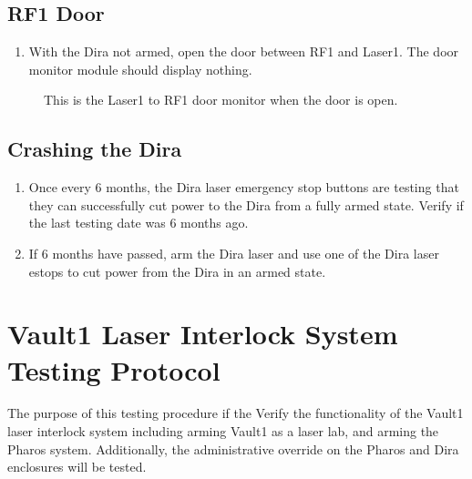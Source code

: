 \documentclass[letterpaper,10pt,english]{sphinxmanual}
\begin{document}
\subsection{RF\sphinxhyphen{}1 Door}
\label{\detokenize{testing_documentation/Laser-1:rf-1-door}}\begin{enumerate}
%
\item {} 
\sphinxAtStartPar
With the Dira not armed, open the door between RF\sphinxhyphen{}1 and Laser\sphinxhyphen{}1.
The door monitor module should display nothing.

\end{enumerate}

\begin{figure}[htbp]
\centering
\capstart

\noindent{}
\caption{ This is the Laser\sphinxhyphen{}1 to RF\sphinxhyphen{}1 door monitor when the door is open.}\label{\detokenize{testing_documentation/Laser-1:id11}}\end{figure}


\subsection{Crashing the Dira}
\label{\detokenize{testing_documentation/Laser-1:crashing-the-dira}}\begin{enumerate}
%
\item {} 
\sphinxAtStartPar
Once every 6 months, the Dira laser emergency stop buttons are testing that they can successfully cut power to the Dira from a fully armed state.
Verify if the last testing date was 6 months ago.

\item {} 
\sphinxAtStartPar
If 6 months have passed, arm the Dira laser and use one of the Dira laser e\sphinxhyphen{}stops to cut power from the Dira in an armed state.

\end{enumerate}

\sphinxstepscope


\section{Vault\sphinxhyphen{}1 Laser Interlock System Testing Protocol}
\label{\detokenize{testing_documentation/Vault-1_laser:vault-1-laser-interlock-system-testing-protocol}}\label{\detokenize{testing_documentation/Vault-1_laser::doc}}
\sphinxAtStartPar
The purpose of this testing procedure if the Verify the functionality of the Vault\sphinxhyphen{}1 laser interlock system including arming Vault\sphinxhyphen{}1 as a laser lab, and arming the Pharos system.
Additionally, the administrative override on the Pharos and Dira enclosures will be tested.
\end{document}
